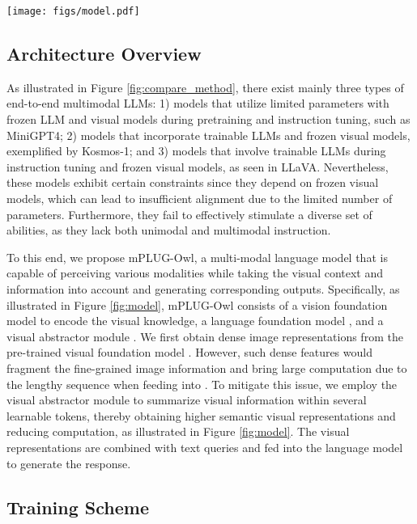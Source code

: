 \documentclass{article}
\newcommand{\modelname}{mPLUG-Owl\xspace}
\begin{document}
\begin{figure*}[!ht]
    \centering
    \texttt{[image: figs/model.pdf]}
    \caption{Our training paradigm and model overview.}
    \label{fig:model}
    \vspace{-2mm}
\end{figure*}

\subsection{Architecture Overview}


As illustrated in Figure \ref{fig:compare_method}, there exist mainly three types of end-to-end multimodal LLMs: 1) models that utilize limited parameters with frozen LLM and visual models during pretraining and instruction tuning, such as MiniGPT4; 2) models that incorporate trainable LLMs and frozen visual models, exemplified by Kosmos-1; and 3) models that involve trainable LLMs during instruction tuning and frozen visual models, as seen in LLaVA. Nevertheless, these models exhibit certain constraints since they depend on frozen visual models, which can lead to insufficient alignment due to the limited number of parameters. Furthermore, they fail to effectively stimulate a diverse set of abilities, as they lack both unimodal and multimodal instruction.

 
To this end, we propose \modelname, a multi-modal language model that is capable of perceiving various modalities while taking the visual context and information into account and generating corresponding outputs. Specifically, as illustrated in Figure \ref{fig:model}, \modelname consists of a vision foundation model  to encode the visual knowledge, a language foundation model , and a visual abstractor module . We first obtain dense image representations from the pre-trained visual foundation model . However, such dense features would fragment the fine-grained image information and bring large computation due to the lengthy sequence when feeding into . To mitigate this issue, we employ the visual abstractor module  to summarize visual information within several learnable tokens, thereby obtaining higher semantic visual representations and reducing computation, as illustrated in Figure \ref{fig:model}. The visual representations are combined with text queries and fed into the language model to generate the response.

\subsection{Training Scheme}
\end{document}
